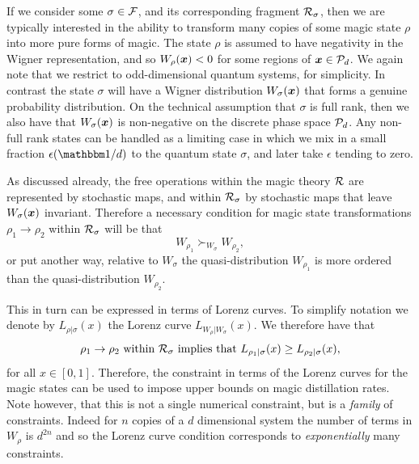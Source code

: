 \documentclass[pra,
aps,
twocolumn,
superscriptaddress,
groupedaddress,
nofootinbib,
reprint
]{revtex4-1}
\begin{document}
If we consider some $\sigma \in \F$, and its corresponding fragment $\R_\sigma$, then we are typically interested in the ability to transform many copies of some magic state $\rho$ into more pure forms of magic. The state $\rho$ is assumed to have negativity in the Wigner representation, and so $W_\rho(\x) < 0$ for some regions of $\x \in \P_d$. We again note that we restrict to odd-dimensional quantum systems, for simplicity. In contrast the state $\sigma$ will have a Wigner distribution $W_\sigma(\x)$ that forms a genuine probability distribution. On the technical assumption that $\sigma$ is full rank, then we also have that $W_\sigma(\x)$ is non-negative on the discrete phase space $\P_d$. Any non-full rank states can be handled as a limiting case in which we mix in a small fraction $\epsilon (\I/d)$ to the quantum state $\sigma$, and later take $\epsilon$ tending to zero.

As discussed already, the free operations within the magic theory $\R$ are represented by stochastic maps, and within $\R_\sigma$ by stochastic maps that leave $W_\sigma(\x)$ invariant. Therefore a necessary condition for magic state transformations $\rho_1 \rightarrow \rho_2$ within $\R_\sigma$ will be that 
\begin{equation}
W_{\rho_1} \succ_{W_{\sigma}} W_{\rho_2},
\end{equation}
or put another way, relative to $W_\sigma$ the quasi-distribution $W_{\rho_1}$ is more ordered than the quasi-distribution $W_{\rho_2}$. 

This in turn can be expressed in terms of Lorenz curves. To simplify notation we denote by $L_{\rho | \sigma}(x)$ the Lorenz curve $L_{W_{\rho} | W_{\sigma}} (x)$. We therefore have that
\begin{equation}
\rho_1 \rightarrow \rho_2 \mbox{ within }\R_\sigma \mbox{ implies that } L_{\rho_1 |\sigma} (x) \ge L_{\rho_2 |\sigma} (x),
\end{equation}
for all $x \in [0,1]$. Therefore, the constraint in terms of the Lorenz curves for the magic states can be used to impose upper bounds on magic distillation rates. Note however, that this is not a single numerical constraint, but is a \emph{family} of constraints. Indeed for $n$ copies of a $d$ dimensional system the number of terms in $W_{\rho}$ is $d^{2n}$ and so the Lorenz curve condition corresponds to \emph{exponentially} many constraints.
\end{document}
